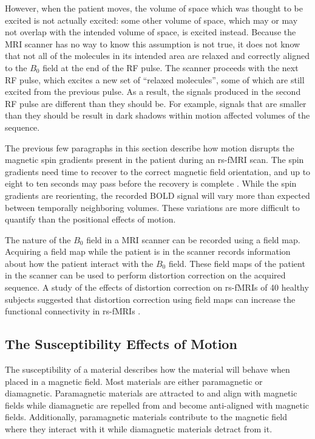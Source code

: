 However, when the patient moves, the volume of space which was thought to be excited is not actually excited: some other volume of space, which may or may not overlap with the intended volume of space, is excited instead. Because the MRI scanner has no way to know this assumption is not true, it does not know that not all of the molecules in its intended area are relaxed and correctly aligned to the $B_0$ field at the end of the RF pulse. The scanner proceeds with the next RF pulse, which excites a new set of ``relaxed molecules'', some of which are still excited from the previous pulse. As a result, the signals produced in the second RF pulse are different than they should be. For example, signals that are smaller than they should be result in dark shadows within motion affected volumes of the sequence.

The previous few paragraphs in this section describe how motion disrupts the magnetic spin gradients present in the patient during an rs-fMRI scan. The spin gradients need time to recover to the correct magnetic field orientation, and up to eight to ten seconds may pass before the recovery is complete \cite{Power2014}. While the spin gradients are reorienting, the recorded BOLD signal will vary more than expected between temporally neighboring volumes. These variations are more difficult to quantify than the positional effects of motion.

The nature of the $B_0$ field in a MRI scanner can be recorded using a field map. Acquiring a field map while the patient is in the scanner records information about how the patient interact with the $B_0$ field. These field maps of the patient in the scanner can be used to perform distortion correction on the acquired sequence. A study of the effects of distortion correction on rs-fMRIs of 40 healthy subjects suggested that distortion correction using field maps can increase the functional connectivity in rs-fMRIs \cite{Togo2017}.

\subsection{The Susceptibility Effects of Motion}

The susceptibility of a material describes how the material will behave when placed in a magnetic field. Most materials are either paramagnetic or diamagnetic. Paramagnetic materials are attracted to and align with magnetic fields while diamagnetic are repelled from and become anti-aligned with magnetic fields. Additionally, paramagnetic materials contribute to the magnetic field where they interact with it while diamagnetic materials detract from it. 

